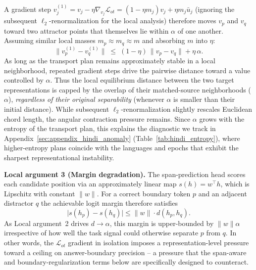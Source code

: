 \documentclass[11pt]{article}
\begin{document}
A gradient step $v_j^{(1)} = v_j - \eta \nabla_{v_j}\mathcal{L}_{ot} = (1-\eta m_j)v_j + \eta m_j \bar{u}_j$ (ignoring the subsequent $\ell_2$-renormalization for the local analysis) therefore moves $v_p$ and $v_q$ toward two attractor points that themselves lie within $\alpha$ of one another. Assuming similar local masses $m_p \approx m_q \approx m$ and absorbing $m$ into $\eta$:
\begin{equation*}
\|v_p^{(1)} - v_q^{(1)}\| \;\le\; (1-\eta)\,\|v_p-v_q\| + \eta\,\alpha.
\end{equation*}
As long as the transport plan remains approximately stable in a local neighborhood, repeated gradient steps drive the pairwise distance toward a value controlled by $\alpha$. Thus the local equilibrium distance between the two target representations is capped by the overlap of their matched-source neighborhoods ($\alpha$), \emph{regardless of their original separability} (whenever $\alpha$ is smaller than their initial distance). While subsequent $\ell_2$-renormalization slightly rescales Euclidean chord length, the angular contraction pressure remains. Since $\alpha$ grows with the entropy of the transport plan, this explains the diagnostic we track in Appendix~\ref{sec:appendix_hindi_anomaly} (Table~\ref{tab:hindi_entropy}), where higher-entropy plans coincide with the languages and epochs that exhibit the sharpest representational instability.

\textbf{Local argument 3 (Margin degradation).} The span-prediction head scores each candidate position via an approximately linear map $s(h)=w^\top h$, which is Lipschitz with constant $\|w\|$. For a correct boundary token $p$ and an adjacent distractor $q$ the achievable logit margin therefore satisfies
\begin{equation*}
\bigl|s(h_p)-s(h_q)\bigr| \le \|w\|\cdot d(h_p,h_q).
\end{equation*}
As Local argument~2 drives $d\to\alpha$, this margin is upper-bounded by $\|w\|\alpha$ irrespective of how well the task signal could otherwise separate $p$ from $q$. In other words, the $\mathcal{L}_{ot}$ gradient in isolation imposes a representation-level pressure toward a ceiling on answer-boundary precision -- a pressure that the span-aware and boundary-regularization terms below are specifically designed to counteract.
\end{document}
